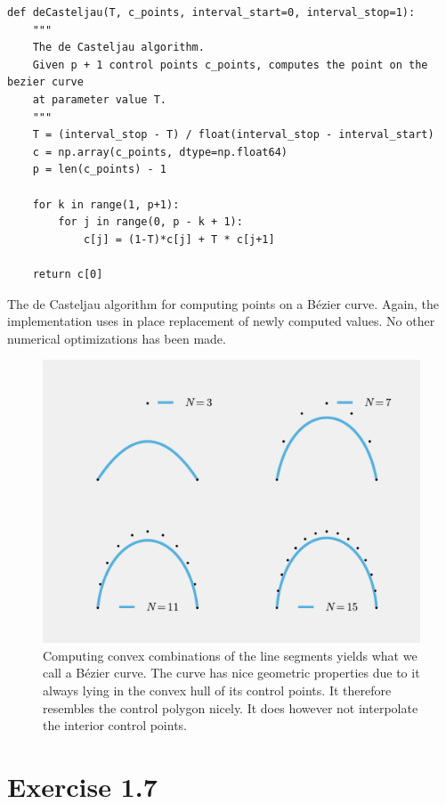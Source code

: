\documentclass[a4paper]{article}
\begin{document}
    \begin{listing}
        \begin{verbatim}
def deCasteljau(T, c_points, interval_start=0, interval_stop=1):
    """
    The de Casteljau algorithm.
    Given p + 1 control points c_points, computes the point on the bezier curve
    at parameter value T.
    """
    T = (interval_stop - T) / float(interval_stop - interval_start)
    c = np.array(c_points, dtype=np.float64)
    p = len(c_points) - 1

    for k in range(1, p+1):
        for j in range(0, p - k + 1):
            c[j] = (1-T)*c[j] + T * c[j+1]

    return c[0]
        \end{verbatim} 
        \caption{The de Casteljau algorithm for computing points on a B\'ezier
        curve. Again, the implementation uses in place replacement of newly
    computed values. No other numerical optimizations has been made.}
        \label{lst:decasteljau}
    \end{listing}

    \begin{figure}[htpb]
        \centering
        \includegraphics[width=0.8\linewidth]{bezier.pdf}
        \caption{Computing convex combinations of the line segments yields what
            we call a B\'ezier curve. The curve has nice geometric properties
            due to it always lying in the convex hull of its control points. It
            therefore resembles the control polygon nicely. It does however not
            interpolate the interior control points.}
        \label{fig:bezier}
    \end{figure}

    \section*{Exercise 1.7}
    \label{sec:exercise_1_7}
    
\end{document}
